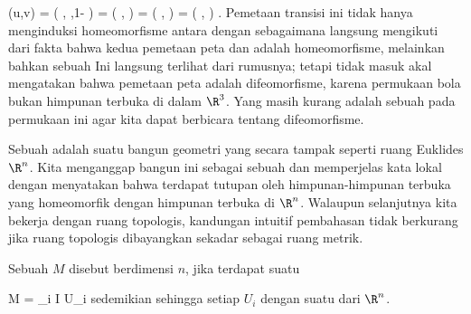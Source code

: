 {\mavergleichskettealignhandlinks
{\vergleichskettealignhandlinks
{ \psi(u,v)
}
{ =} { \beta \left(  {  }, {  } ,1- {  }  \right)
}
{ =} { \left(  {  } , {  }  \right)
}
{ =} { \left(  {  } , {  }  \right)
}
{ =} { \left(  {  } , {  }  \right)
}
}
{}
{}{.}
Pemetaan transisi ini tidak hanya menginduksi homeomorfisme antara  dengan  sebagaimana langsung mengikuti dari fakta bahwa kedua pemetaan peta \mathkor {} {\alpha} {dan} {\beta} {} adalah homeomorfisme, melainkan bahkan sebuah  Ini langsung terlihat dari rumusnya; tetapi tidak masuk akal mengatakan bahwa pemetaan peta adalah difeomorfisme, karena permukaan bola bukan himpunan terbuka di dalam $\R^3$. Yang masih kurang adalah sebuah  pada permukaan ini agar kita dapat berbicara tentang difeomorfisme.

}
Sebuah  {} adalah suatu bangun geometri yang secara  tampak seperti ruang Euklides $\R^n$. Kita menganggap bangun ini sebagai sebuah
dan memperjelas kata lokal dengan menyatakan bahwa terdapat tutupan oleh himpunan-himpunan terbuka yang homeomorfik dengan himpunan terbuka di $\R^n$. Walaupun selanjutnya kita bekerja dengan ruang topologis, kandungan intuitif pembahasan tidak berkurang jika ruang topologis dibayangkan sekadar sebagai ruang metrik.


{}
{

Sebuah
$M$ disebut  berdimensi  $n$, jika terdapat suatu

\mavergleichskette
{\vergleichskette
{ M
}
{ = }{  \bigcup_{i \in I} U_i
}
{  }{
}
{    }{
}
{   }{
}
}
{}{}{}
sedemikian sehingga setiap $U_i$
dengan suatu
dari $\R^n$.

}


